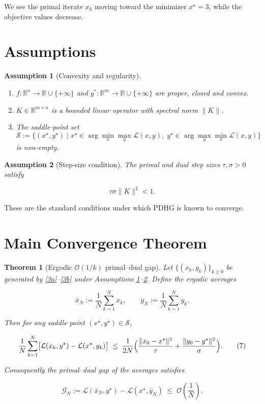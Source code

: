 \documentclass{article}
\newtheorem{theorem}{Theorem}
\newtheorem{assumption}{Assumption}
\newcommand{\norm}[1]{\|#1\|}
\begin{document}
We see the primal iterate $x_{k}$ moving toward the minimizer $x^{\star}=3$, while the objective values decrease.

\section*{Assumptions}
\begin{assumption}[Convexity and regularity]\label{as:convex}
\begin{enumerate}
\item $f:\mathbb{R}^{n}\to\mathbb{R}\cup\{+\infty\}$ and $g^{*}:\mathbb{R}^{m}\to\mathbb{R}\cup\{+\infty\}$ are proper, closed and convex.
\item $K\in\mathbb{R}^{m\times n}$ is a bounded linear operator with spectral norm $\|K\|$.
\item The saddle‑point set 
\[
\mathcal{S}:=\bigl\{(x^{\star},y^{\star})\mid 
x^{\star}\in\arg\min_{x} \max_{y}\mathcal{L}(x,y),\;
y^{\star}\in\arg\max_{y} \min_{x}\mathcal{L}(x,y)\bigr\}
\]
is non‑empty.
\end{enumerate}
\end{assumption}

\begin{assumption}[Step‑size condition]\label{as:stepsize}
The primal and dual step sizes $\tau,\sigma>0$ satisfy  

\[
\tau\sigma\|K\|^{2}<1.
\tag{6}
\]
\end{assumption}

These are the standard conditions under which PDHG is known to converge.

\section*{Main Convergence Theorem}
\begin{theorem}[Ergodic $\mathcal{O}(1/k)$ primal–dual gap]\label{thm:main}
Let $\{(x_{k},y_{k})\}_{k\ge 0}$ be generated by \eqref{3a}–\eqref{3b} under Assumptions \ref{as:convex}–\ref{as:stepsize}.  
Define the ergodic averages  

\[
\bar{x}_{N}:=\frac{1}{N}\sum_{k=1}^{N}x_{k},
\qquad
\bar{y}_{N}:=\frac{1}{N}\sum_{k=1}^{N}y_{k}.
\]

Then for any saddle point $(x^{\star},y^{\star})\in\mathcal{S}$,

\[
\frac{1}{N}\sum_{k=1}^{N}
\bigl[\mathcal{L}(x_{k},y^{\star})-\mathcal{L}(x^{\star},y_{k})\bigr]
\;\le\;
\frac{1}{2N}\Bigl(
\frac{\norm{x_{0}-x^{\star}}^{2}}{\tau}
+\frac{\norm{y_{0}-y^{\star}}^{2}}{\sigma}
\Bigr).
\tag{7}
\]

Consequently the primal–dual gap of the averages satisfies  

\[
\mathcal{G}_{N}:=
\mathcal{L}(\bar{x}_{N},y^{\star})-\mathcal{L}(x^{\star},\bar{y}_{N})
\;\le\; \mathcal{O}\!\left(\frac{1}{N}\right).
\]
\end{theorem}
\end{document}
